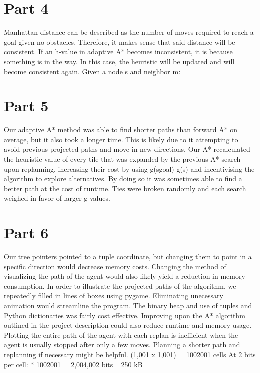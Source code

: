 \documentclass[a4paper,12pt]{article}
\begin{document}
\section{Part 4}
Manhattan distance can be described as the number of moves required to reach a goal given no obstacles. Therefore, it makes sense that said distance will be consistent. If an h-value in adaptive A* becomes inconsistent, it is because something is in the way. In this case, the heuristic will be updated and will become consistent again. \newline
Given a node s and neighbor m: \newline
\section{Part 5}
Our adaptive A* method was able to find shorter paths than forward A* on average, but it also took a longer time. This is likely due to it attempting to avoid previous projected paths and move in new directions. Our A* recalculated the heuristic value of every tile that was expanded by the previous A* search upon replanning, increasing their cost by using g(sgoal)-g(s) and incentivising the algorithm to explore alternatives.  By doing so it was sometimes able to find a better path at the cost of runtime. Ties were broken randomly and each search weighed in favor of larger g values.
\section{Part 6}
Our tree pointers pointed to a tuple coordinate, but changing them to point in a specific direction would decrease memory costs. Changing the method of visualizing the path of the agent would also likely yield a reduction in memory consumption. In order to illustrate the projected paths of the algorithm, we repeatedly filled in lines of boxes using pygame. Eliminating unecessary animation would streamline the program. The binary heap and use of tuples and Python dictionaries was fairly cost effective. Improving upon the A* algorithm outlined in the project description could also reduce runtime and memory usage. Plotting the entire path of the agent with each replan is inefficient when the agent is usually stopped after only a few moves. Planning a shorter path and replanning if necessary might be helpful. \newline
(1,001 x 1,001) = 1002001 cells \newline
At 2 bits per cell:  * 1002001  = 2,004,002 bits ~ 250 kB \newline \newline
\end{document}
